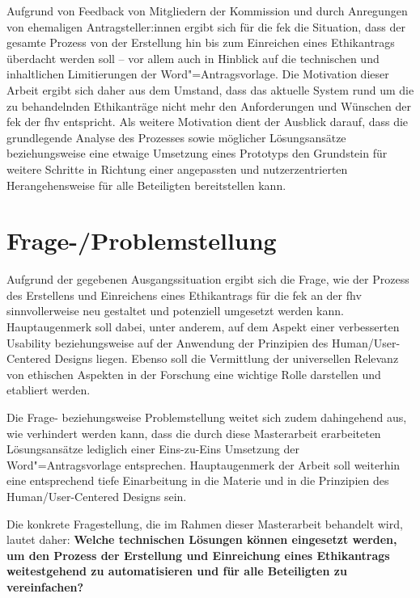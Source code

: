 \documentclass[a4paper,12pt,twoside,numbers=noendperiod]{scrreprt}
\begin{document}
\medskip

Aufgrund von Feedback von Mitgliedern der Kommission und durch Anregungen von ehemaligen Antragsteller:innen ergibt sich für die \acl{fek} die Situation, dass der gesamte Prozess von der Erstellung hin bis zum Einreichen eines Ethikantrags überdacht werden soll -- vor allem auch in Hinblick auf die technischen und inhaltlichen Limitierungen der Word"=Antragsvorlage. Die Motivation dieser Arbeit ergibt sich daher aus dem Umstand, dass das aktuelle System rund um die zu behandelnden Ethikanträge nicht mehr den Anforderungen und Wünschen der \acl{fek} der \acl{fhv} entspricht. Als weitere Motivation dient der Ausblick darauf, dass die grundlegende Analyse des Prozesses sowie möglicher Lösungsansätze beziehungsweise eine etwaige Umsetzung eines Prototyps den Grundstein für weitere Schritte in Richtung einer angepassten und nutzerzentrierten Herangehensweise für alle Beteiligten bereitstellen kann. 

\section{Frage-/Problemstellung}
\label{sec:frage-problemstellung}

Aufgrund der gegebenen Ausgangssituation ergibt sich die Frage, wie der Prozess des Erstellens und Einreichens eines Ethikantrags für die \acl{fek} an der \acl{fhv} sinnvollerweise neu gestaltet und potenziell umgesetzt werden kann. Hauptaugenmerk soll dabei, unter anderem, auf dem Aspekt einer verbesserten Usability beziehungsweise auf der Anwendung der Prinzipien des Human/User-Centered Designs liegen. Ebenso soll die Vermittlung der universellen Relevanz von ethischen Aspekten in der Forschung eine wichtige Rolle darstellen und etabliert werden.

Die Frage- beziehungsweise Problemstellung weitet sich zudem dahingehend aus, wie verhindert werden kann, dass die durch diese Masterarbeit erarbeiteten Lösungsansätze lediglich einer Eins-zu-Eins Umsetzung der Word"=Antragsvorlage entsprechen. Hauptaugenmerk der Arbeit soll weiterhin eine entsprechend tiefe Einarbeitung in die Materie und in die Prinzipien des Human/User-Centered Designs sein.

\medskip

Die konkrete Fragestellung, die im Rahmen dieser Masterarbeit behandelt wird, lautet daher:\newline
\textbf{Welche technischen Lösungen können eingesetzt werden, um den Prozess der Erstellung und Einreichung eines Ethikantrags weitestgehend zu automatisieren und für alle Beteiligten zu vereinfachen?}
\end{document}
